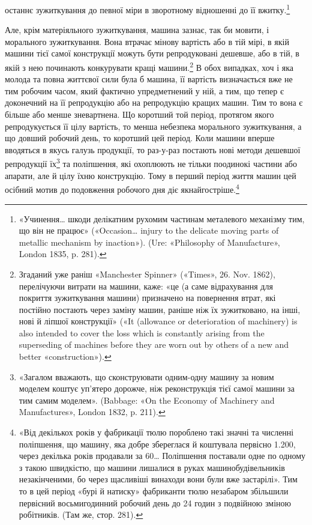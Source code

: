 \parcont{}  %
останнє зужиткування до певної міри в зворотному відношенні
до її вжитку.\footnote{
«Учинення\dots{} шкоди делікатним рухомим частинам металевого
механізму тим, що він не працює» («Occasion\dots{} injury to the delicate
moving parts of metallic mechanism by inaction»). (Ure: «Philosophy
of Manufacture», London 1835, p. 281).
}

Але, крім матеріяльного зужиткування, машина зазнає, так би
мовити, і морального зужиткування. Вона втрачає мінову вартість
або в тій мірі, в якій машини тієї самої конструкції можуть бути
репродуковані дешевше, або в тій, в якій з нею починають конкурувати
кращі машини.\footnote{
Згаданий уже раніш «Manchester Spinner» («Times», 26. Nov. 1862),
перелічуючи витрати на машини, каже: «це (а саме відрахування для покриття
зужиткування машини) призначено на повернення втрат, які постійно
постають через заміну машин, раніше ніж їх зужитковано, на інші,
нові й ліпшої конструкції» («It (allowance or deterioration of machinery)
is also intended to cover the loss which is constantly arising from the superseding
of machines before they are worn out by others of a new and better
«construction»).
} В обох випадках, хоч і яка молода
та повна життєвої сили була б машина, її вартість визначається вже
не тим робочим часом, який фактично упредметнений у ній, а тим,
що тепер є доконечний на її репродукцію або на репродукцію
кращих машин. Тим то вона є більше або менше зневартнена.
Що коротший той період, протягом якого репродукується її цілу
вартість, то менша небезпека морального зужиткування, а що
довший робочий день, то коротший цей період. Коли машини вперше
вводяться в якусь галузь продукції, то раз-у-раз постають
нові методи дешевшої репродукції їх\footnote{
«Загалом вважають, що сконструювати одним-одну машину за
новим моделем коштує уп’ятеро дорожче, ніж реконструкція тієї самої
машини за тим самим моделем». (Babbage: «On the Economy of Machinery
and Manufactures», London 1832, p. 211).
} та поліпшення, які охоплюють
не тільки поодинокі частини або апарати, але й цілу їхню
конструкцію. Тому в перший період життя машин цей осібний
мотив до подовження робочого дня діє якнайгостріше.\footnote{«Від декількох років у фабрикації тюлю пороблено такі значні та
численні поліпшення, що машину, яка добре збереглася й коштувала
первісно \num{1.200}, через декілька років продавали за
60\dots{} Поліпшення поставали одне по одному з такою
швидкістю, що машини лишалися в руках машинобудівельників незакінченими,
бо через щасливіші винаходи вони були вже застарілі». Тим то
в цей період «бурі й натиску» фабриканти тюлю незабаром збільшили первісний
восьмигодинний робочий день до 24 годин з подвійною зміною
робітників. (Там же, стор. 281).}

